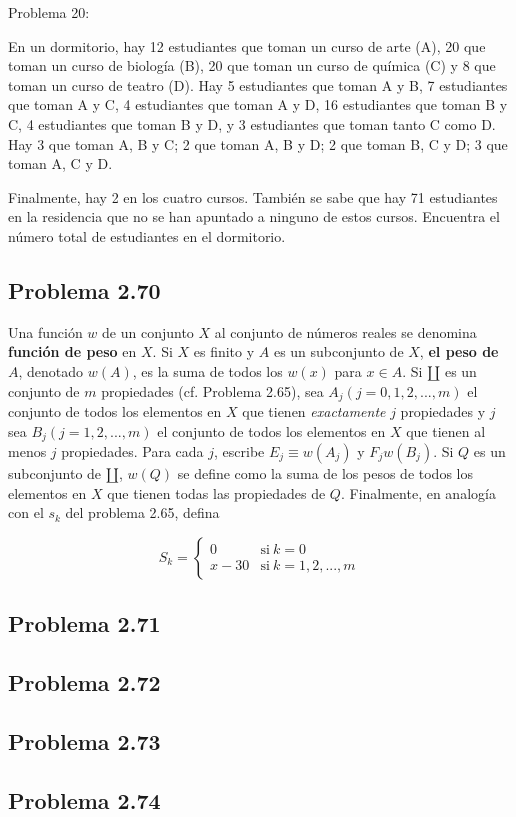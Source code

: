 \documentclass[12pt]{article}
\begin{document}
Problema 20:

En un dormitorio, hay 12 estudiantes que toman un curso de arte (A), 20 que
toman un curso de biología (B), 20 que toman un curso de química (C) y 8 que
toman un curso de teatro (D). Hay 5 estudiantes que toman A y B, 7 estudiantes
que toman A y C, 4 estudiantes que toman A y D, 16 estudiantes que toman B y C,
4 estudiantes que toman B y D, y 3 estudiantes que toman tanto C como D. Hay 3
que toman A, B y C; 2 que toman A, B y D; 2 que toman B, C y D; 3 que toman A, C
y D.

Finalmente, hay 2 en los cuatro cursos. También se sabe que hay 71 estudiantes
en la residencia que no se han apuntado a ninguno de estos cursos. Encuentra el
número total de estudiantes en el dormitorio.

\subsection*{Problema 2.70}

Una función $w$ de un conjunto $X$ al conjunto de números reales se denomina
\textbf{función de peso} en $X$. Si $X$ es finito y $A$ es un subconjunto de
$X$, \textbf{el peso de $A$}, denotado $w(A)$, es la suma de todos los $w(x)$
para $x \in A$. Si $\amalg$ es un conjunto de $m$ propiedades (cf. Problema
2.65), sea $A_j (j = 0, 1, 2,..., m)$ el conjunto de todos los elementos en $X$
que tienen \textit{exactamente} $j$ propiedades y $j$ sea $B_j (j = 1, 2,...,
m)$ el conjunto de todos los elementos en $X$ que tienen al menos $j$
propiedades. Para cada $j$, escribe $E_j \equiv w(A_j)$ y $F_j w(B_j)$. Si $Q$
es un subconjunto de $\amalg$, $w(Q)$ se define como la suma de los pesos de
todos los elementos en $X$ que tienen todas las propiedades de $Q$. Finalmente,
en analogía con el $s_k$ del problema 2.65, defina

\begin{equation}
    \label{eq:aqui-le-mostramos-como-hacerle-la-llave-grande}
    S_k = \left\{
          \begin{array}{ll}
        0      & \mathrm{si\ } k=0 \\
        x - 30 & \mathrm{si\ } k=1,2,...,m
          \end{array}
        \right.
  \end{equation}

\subsection*{Problema 2.71}

\subsection*{Problema 2.72}

\subsection*{Problema 2.73}

\subsection*{Problema 2.74}
\end{document}
